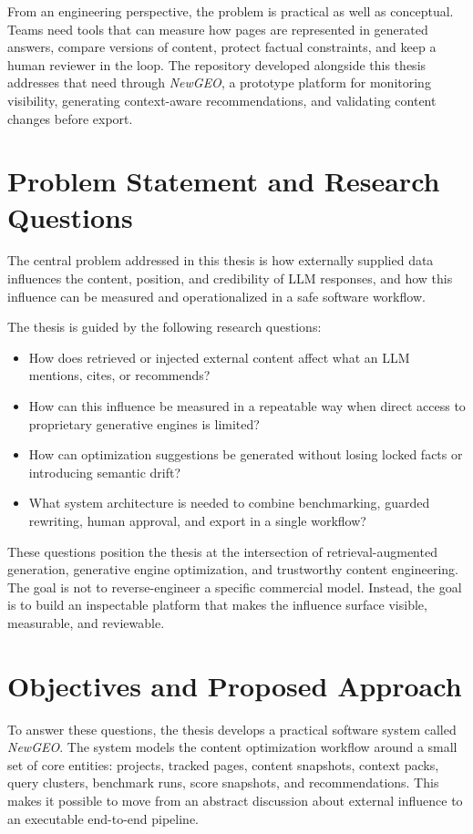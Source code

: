From an engineering perspective, the problem is practical as well as conceptual. Teams need
tools that can measure how pages are represented in generated answers, compare versions of
content, protect factual constraints, and keep a human reviewer in the loop. The repository
developed alongside this thesis addresses that need through \textit{NewGEO}, a prototype
platform for monitoring visibility, generating context-aware recommendations, and validating
content changes before export.

\section{Problem Statement and Research Questions}

The central problem addressed in this thesis is how externally supplied data influences the
content, position, and credibility of LLM responses, and how this influence can be measured
and operationalized in a safe software workflow.

The thesis is guided by the following research questions:
\begin{itemize}
    \item How does retrieved or injected external content affect what an LLM mentions, cites, or recommends?
    \item How can this influence be measured in a repeatable way when direct access to proprietary generative engines is limited?
    \item How can optimization suggestions be generated without losing locked facts or introducing semantic drift?
    \item What system architecture is needed to combine benchmarking, guarded rewriting, human approval, and export in a single workflow?
\end{itemize}

These questions position the thesis at the intersection of retrieval-augmented generation,
generative engine optimization, and trustworthy content engineering. The goal is not to
reverse-engineer a specific commercial model. Instead, the goal is to build an inspectable
platform that makes the influence surface visible, measurable, and reviewable.

\section{Objectives and Proposed Approach}

To answer these questions, the thesis develops a practical software system called
\textit{NewGEO}. The system models the content optimization workflow around a small set of
core entities: projects, tracked pages, content snapshots, context packs, query clusters,
benchmark runs, score snapshots, and recommendations. This makes it possible to move from
an abstract discussion about external influence to an executable end-to-end pipeline.

